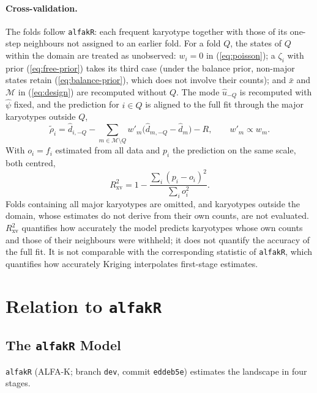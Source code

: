 \documentclass[11pt]{article}
\begin{document}
\paragraph{Cross-validation.}
The folds follow \texttt{alfakR}: each frequent karyotype together with those
of its one-step neighbours not assigned to an earlier fold. For a fold $Q$,
the states of $Q$ within the domain are treated as unobserved: $w_i=0$ in
(\ref{eq:poisson}); a $\zeta_i$ with prior (\ref{eq:free-prior}) takes its
third case (under the balance prior, non-major states retain
(\ref{eq:balance-prior}), which does not involve their counts); and $\bar x$
and $\mathcal{M}$ in (\ref{eq:design}) are recomputed without $Q$. The mode
$\hat u_{-Q}$ is recomputed with $\hat\psi$ fixed, and the prediction for
$i\in Q$ is aligned to the full fit through the major karyotypes outside $Q$,
\begin{equation}
  \tilde\rho_i=\hat d_{i,-Q}-\sum_{m\in\mathcal{M}\setminus Q}w'_m\bigl(\hat d_{m,-Q}-\hat d_m\bigr)-R,
  \qquad w'_m\propto w_m .
  \label{eq:xval-align}
\end{equation}
With $o_i=f_i$ estimated from all data and $p_i$ the prediction on the same
scale, both centred,
\begin{equation}
  R^2_{\mathrm{xv}}=1-\frac{\sum_i(p_i-o_i)^2}{\sum_io_i^2}.
  \label{eq:r2r}
\end{equation}
Folds containing all major karyotypes are omitted, and karyotypes outside the
domain, whose estimates do not derive from their own counts, are not
evaluated. $R^2_{\mathrm{xv}}$ quantifies how accurately the model predicts
karyotypes whose own counts and those of their neighbours were withheld; it
does not quantify the accuracy of the full fit. It is not comparable with the
corresponding statistic of \texttt{alfakR}, which quantifies how accurately
Kriging interpolates first-stage estimates.

\section{Relation to \texttt{alfakR}}
\label{sec:alfakR}

\subsection{The \texttt{alfakR} Model}

\texttt{alfakR} (ALFA-K; branch \texttt{dev}, commit \texttt{eddeb5e})
estimates the landscape in four stages.
\end{document}
